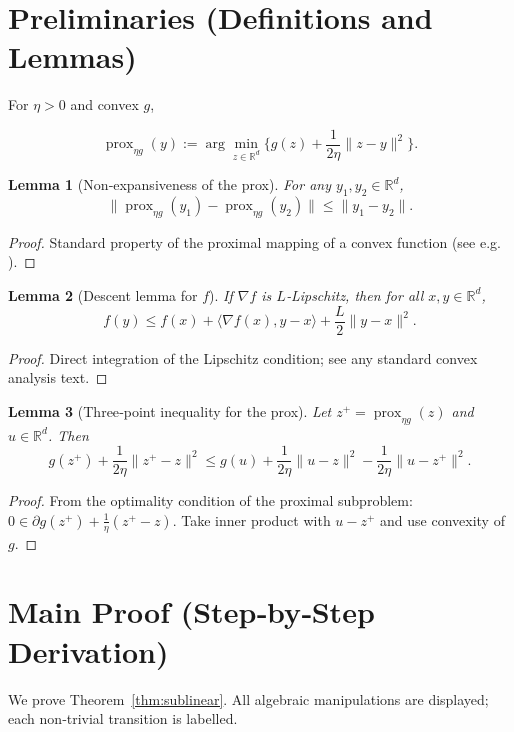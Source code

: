 \documentclass{article}
\newtheorem{lemma}{Lemma}
\newcommand{\prox}{\operatorname{prox}}
\newcommand{\grad}{\nabla}
\newcommand{\R}{\mathbb{R}}
\begin{document}
\section*{Preliminaries (Definitions and Lemmas)}
\begin{definition}
For $\eta>0$ and convex $g$,  

\[
\prox_{\eta g}(y):=\arg\min_{z\in\R^{d}}\Big\{ g(z)+\frac{1}{2\eta}\|z-y\|^{2}\Big\}.
\tag{D1}
\]
\end{definition}

\begin{lemma}[Non‑expansiveness of the prox]\label{lem:prox-nonexp}
For any $y_{1},y_{2}\in\R^{d}$,
\[
\|\prox_{\eta g}(y_{1})-\prox_{\eta g}(y_{2})\|\le\|y_{1}-y_{2}\|.
\tag{L1}
\]
\end{lemma}
\begin{proof}
Standard property of the proximal mapping of a convex function (see e.g. \cite{Parikh2014}).
\end{proof}

\begin{lemma}[Descent lemma for $f$]\label{lem:descent}
If $\grad f$ is $L$‑Lipschitz, then for all $x,y\in\R^{d}$,
\[
f(y)\le f(x)+\langle\grad f(x),y-x\rangle+\frac{L}{2}\|y-x\|^{2}.
\tag{L2}
\]
\end{lemma}
\begin{proof}
Direct integration of the Lipschitz condition; see any standard convex analysis text.
\end{proof}

\begin{lemma}[Three‑point inequality for the prox]\label{lem:prox-3pt}
Let $z^{+}= \prox_{\eta g}(z)$ and $u\in\R^{d}$. Then
\[
g(z^{+})+ \frac{1}{2\eta}\|z^{+}-z\|^{2}
\le g(u)+\frac{1}{2\eta}\|u-z\|^{2}
-\frac{1}{2\eta}\|u-z^{+}\|^{2}.
\tag{L3}
\]
\end{lemma}
\begin{proof}
From the optimality condition of the proximal subproblem:
$0\in\partial g(z^{+})+\frac{1}{\eta}(z^{+}-z)$.  
Take inner product with $u-z^{+}$ and use convexity of $g$.
\end{proof}

\section*{Main Proof (Step‑by‑Step Derivation)}
We prove Theorem~\ref{thm:sublinear}.  All algebraic manipulations are displayed; each non‑trivial transition is labelled.
\end{document}
